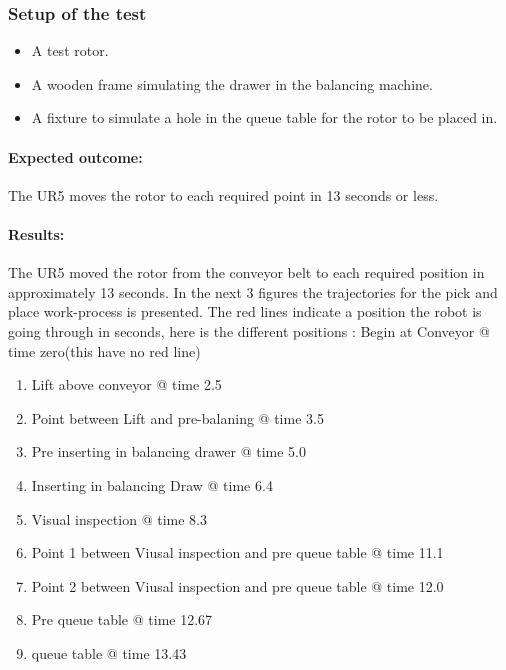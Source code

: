 \subsubsection{Setup of the test}

\begin{itemize}
   \item A test rotor.
   \item A wooden frame simulating the drawer in the balancing machine.
   \item A fixture to simulate a hole in the queue table for the rotor to be placed in.
   
\end{itemize}

\paragraph{Expected outcome:}
The UR5 moves the rotor to each required point in 13 seconds or less. 

\paragraph{Results:}
The UR5 moved the rotor from the conveyor belt to each required position in approximately 13 seconds. In the next 3 figures the trajectories for the pick and place work-process is presented. The red lines indicate a position the robot is going through in seconds, here is the different positions : Begin at Conveyor @ time zero(this have no red line)
\begin{enumerate}
    \item Lift above conveyor @ time 2.5
    \item Point between Lift and pre-balaning @ time 3.5
    \item Pre inserting in balancing drawer @ time 5.0
    \item Inserting in balancing Draw @ time 6.4
    \item Visual inspection @ time 8.3
    \item Point 1 between Viusal inspection and pre queue table @ time 11.1
    \item Point 2 between Viusal inspection and pre queue table @ time 12.0
    \item Pre queue table @ time 12.67
    \item queue table @ time 13.43
\end{enumerate}

